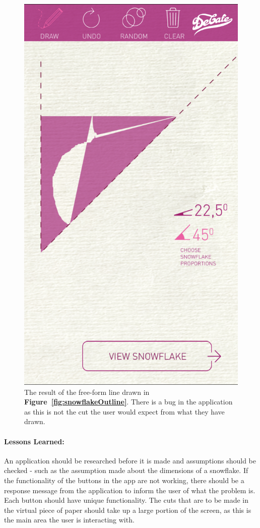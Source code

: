 \documentclass[11pt]{article}
\begin{document}
\begin{figure}[!ht]
\begin{minipage}{0.45\textwidth}
                            \includegraphics[width=0.7\linewidth]{Images/snowflakeCut}
                            \caption{The result of the free-form line drawn in \textbf{Figure~\ref{fig:snowflakeOutline}}. There is a bug in the application as this is not the cut the user would expect from what they have drawn.}
                            \label{fig:snowflakeCut}
                        \end{minipage}
                    \end{figure}
        
                \paragraph{Lessons Learned:}
                An application should be researched before it is made and assumptions should be checked - such as the assumption made about the dimensions of a snowflake. If the functionality of the buttons in the app are not working, there should be a response message from the application to inform the user of what the problem is. Each button should have unique functionality. The cuts that are to be made in the virtual piece of paper should take up a large portion of the screen, as this is the main area the user is interacting with.
            
\end{document}
